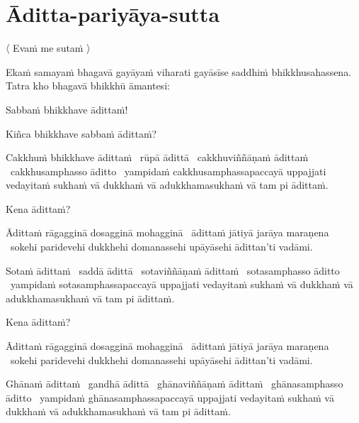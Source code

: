 \section{Āditta-pariyāya-sutta}
\label{aditta-pariyaya}

\begin{leader}
  〈 Evaṁ me sutaṁ 〉
\end{leader}

\begin{pali-hang}
Ekaṁ samayaṁ bhagavā gayāyaṁ viharati gayāsīse saddhiṁ bhikkhusahassena. Tatra kho bhagavā bhikkhū āmantesi:
\end{pali-hang}

Sabbaṁ bhikkhave ādittaṁ!

Kiñca bhikkhave sabbaṁ ādittaṁ?

\begin{pali-hang}
Cakkhuṁ bhikkhave ādittaṁ \breathmark\ rūpā ādittā \breathmark\ cakkhuviññāṇaṁ ādittaṁ \breathmark\ cakkhusamphasso āditto \breathmark\ yampidaṁ cakkhusamphassapaccayā uppajjati vedayitaṁ sukhaṁ vā dukkhaṁ vā adukkhamasukhaṁ vā tam pi ādittaṁ.
\end{pali-hang}

Kena ādittaṁ?

\begin{pali-hang}
Ādittaṁ rāgagginā dosagginā mohagginā \breathmark\ ādittaṁ jātiyā jarāya maraṇena \breathmark\ sokehi paridevehi dukkhehi domanassehi upāyāsehi ādittan'ti vadāmi.
\end{pali-hang}

\begin{pali-hang}
Sotaṁ ādittaṁ \breathmark\ saddā ādittā \breathmark\ sotaviññāṇaṁ ādittaṁ \breathmark\ sotasamphasso āditto \breathmark\ yampidaṁ sotasamphassapaccayā uppajjati vedayitaṁ sukhaṁ vā dukkhaṁ vā adukkhamasukhaṁ vā tam pi ādittaṁ.
\end{pali-hang}

Kena ādittaṁ?

\begin{pali-hang}
Ādittaṁ rāgagginā dosagginā mohagginā \breathmark\ ādittaṁ jātiyā jarāya maraṇena \breathmark\ sokehi paridevehi dukkhehi domanassehi upāyāsehi ādittan'ti vadāmi.
\end{pali-hang}

\begin{pali-hang}
Ghānaṁ ādittaṁ \breathmark\ gandhā ādittā \breathmark\ ghānaviññāṇaṁ ādittaṁ \breathmark\ ghānasamphasso āditto \breathmark\ yampidaṁ ghānasamphassapaccayā uppajjati vedayitaṁ sukhaṁ vā dukkhaṁ vā adukkhamasukhaṁ vā tam pi ādittaṁ.
\end{pali-hang}

